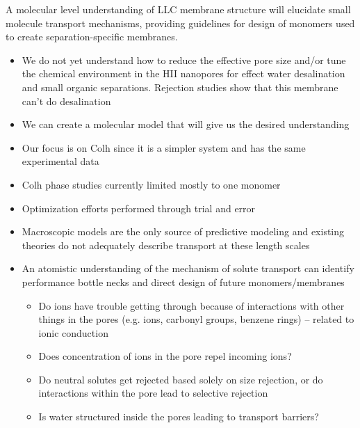 \documentclass{article}
\begin{document}
	A molecular level understanding of LLC membrane structure will elucidate small molecule transport mechanisms, providing guidelines for design of monomers used to create separation-specific membranes.
	\begin{itemize}
		\item We do not yet understand how to reduce the effective pore size and/or tune the chemical environment in the HII nanopores for effect water desalination and small organic separations. Rejection studies show that this membrane can't do desalination
		\item We can create a molecular model that will give us the desired understanding
		\item Our focus is on Colh since it is a simpler system and has the same experimental data
		\item Colh phase studies currently limited mostly to one monomer
		\item Optimization efforts performed through trial and error
		\item Macroscopic models are the only source of predictive modeling and existing theories do not adequately describe transport at these length scales
		\item An atomistic understanding of the mechanism of solute transport can identify
		performance bottle necks and direct design of future monomers/membranes
		\begin{itemize}
			\item Do ions have trouble getting through because of interactions with other things in the pores (e.g. ions, carbonyl groups, benzene rings) -- related to ionic conduction
			\item Does concentration of ions in the pore repel incoming ions?
			\item Do neutral solutes get rejected based solely on size rejection, or do interactions within the pore lead to selective rejection
			\item Is water structured inside the pores leading to transport barriers?  
		\end{itemize}
	\end{itemize}
	 
\end{document}
